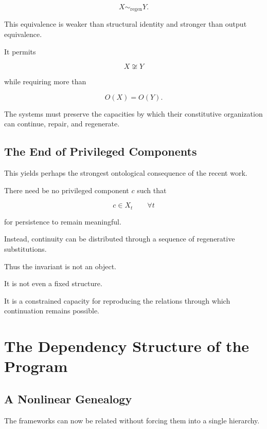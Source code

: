 \documentclass[11pt]{article}
\theoremstyle{remark}
\begin{document}
\begin{equation}
X\sim_{\mathrm{regen}}Y.
\end{equation}

This equivalence is weaker than structural identity and stronger than output equivalence.

It permits

\begin{equation}
X\not\cong Y
\end{equation}

while requiring more than

\begin{equation}
O(X)=O(Y).
\end{equation}

The systems must preserve the capacities by which their constitutive organization can continue, repair, and regenerate.

\subsection{The End of Privileged Components}

This yields perhaps the strongest ontological consequence of the recent work.

There need be no privileged component $c$ such that

\begin{equation}
c\in X_t
\qquad
\forall t
\end{equation}

for persistence to remain meaningful.

Instead, continuity can be distributed through a sequence of regenerative substitutions.

Thus the invariant is not an object.

It is not even a fixed structure.

It is a constrained capacity for reproducing the relations through which continuation remains possible.

\section{The Dependency Structure of the Program}

\subsection{A Nonlinear Genealogy}

The frameworks can now be related without forcing them into a single hierarchy.
\end{document}
